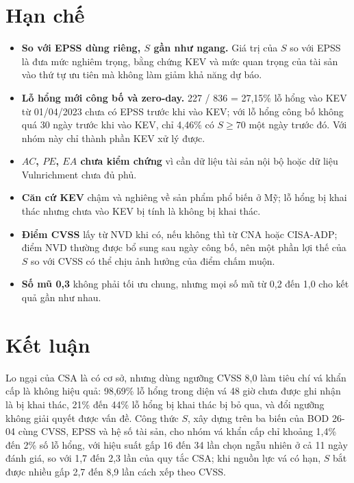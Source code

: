 \documentclass[conference]{IEEEtran}
\begin{document}
\section{Hạn chế}\label{sec:hanche}

\begin{itemize}
\item \textbf{So với EPSS dùng riêng, $S$ gần như ngang.} Giá trị của $S$ so với EPSS là đưa mức nghiêm trọng, bằng
chứng KEV và mức quan trọng của tài sản vào thứ tự ưu tiên mà không làm giảm khả năng dự báo.
\item \textbf{Lỗ hổng mới công bố và zero-day.} 227 / 836 = 27,15\% lỗ hổng vào KEV từ 01/04/2023 chưa có EPSS trước
khi vào KEV; với lỗ hổng công bố không quá 30 ngày trước khi vào KEV, chỉ 4,46\% có $S \ge 70$ một ngày trước đó. Với
nhóm này chỉ thành phần KEV xử lý được.
\item \textbf{$AC$, $\mathit{PE}$, $\mathit{EA}$ chưa kiểm chứng} vì cần dữ liệu tài sản nội bộ hoặc dữ liệu
Vulnrichment chưa đủ phủ.
\item \textbf{Căn cứ KEV} chậm và nghiêng về sản phẩm phổ biến ở Mỹ; lỗ hổng bị khai thác nhưng chưa vào KEV bị tính
là không bị khai thác.
\item \textbf{Điểm CVSS} lấy từ NVD khi có, nếu không thì từ CNA hoặc CISA-ADP; điểm NVD thường được bổ sung sau ngày
công bố, nên một phần lợi thế của $S$ so với CVSS có thể chịu ảnh hưởng của điểm chấm muộn.
\item \textbf{Số mũ 0,3} không phải tối ưu chung, nhưng mọi số mũ từ 0,2 đến 1,0 cho kết quả gần như nhau.
\end{itemize}

\section{Kết luận}

Lo ngại của CSA là có cơ sở, nhưng dùng ngưỡng CVSS 8,0 làm tiêu chí vá khẩn cấp là không hiệu quả: 98,69\% lỗ hổng
trong diện vá 48 giờ chưa được ghi nhận là bị khai thác, 21\% đến 44\% lỗ hổng bị khai thác bị bỏ qua, và đổi ngưỡng
không giải quyết được vấn đề. Công thức $S$, xây dựng trên ba biến của BOD 26-04 cùng CVSS, EPSS và hệ số tài sản,
cho nhóm vá khẩn cấp chỉ khoảng 1,4\% đến 2\% số lỗ hổng, với hiệu suất gấp 16 đến 34 lần chọn ngẫu nhiên ở cả 11
ngày đánh giá, so với 1,7 đến 2,3 lần của quy tắc CSA; khi nguồn lực vá có hạn, $S$ bắt được nhiều gấp 2,7 đến 8,9
lần cách xếp theo CVSS.
\end{document}
